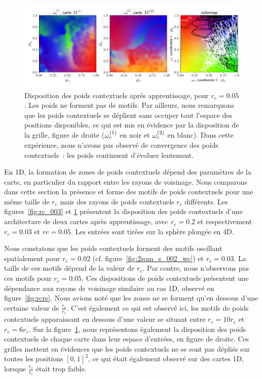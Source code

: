 \documentclass[../main]{subfiles}
\begin{document}
\begin{figure}
	\includegraphics[width=\textwidth]{wc_rc005_grid.pdf}
	\caption{Disposition des poids contextuels après apprentissage, pour $r_c =0.05$. Les poids ne forment pas de motifs. Par ailleurs, nous remarquons que les poids contextuels se déplient sans occuper tout l'espace des positions disponibles, ce qui est mis en évidence par la disposition de la grille, figure de droite ($\omega_c^{({1})}$ en noir et $\omega_c^{({2})}$ en blanc).
	Dans cette expérience, nous n'avons pas observé de convergence des poids contextuels~: les poids continuent d'évoluer lentement.
	\label{fig:rc_005}}
\end{figure}

En 1D, la formation de zones de poids contextuels dépend des paramètres de la carte, en particulier du rapport entre les rayons de voisinage.
Nous comparons dans cette section la présence et forme des motifs de poids contextuels pour une même taille de $r_e$ mais des rayons de poids contextuels $r_c$ différents.
Les figures~\ref{fig:rc_003} et \ref{fig:rc_005} présentent la disposition des poids contextuels d'une architecture de deux cartes après apprentissage, avec $r_e = 0.2$ et respectivement $r_c = 0.03$ et $rc = 0.05$. Les entrées sont tirées sur la sphère plongée en 4D.


Nous constatons que les poids contextuels forment des motifs oscillant spatialement pour $r_c = 0.02$ (cf. figure~\ref{fig:2som_s_002_wc}) et $r_c = 0.03$. La taille de ces motifs dépend de la valeur de $r_c$. Par contre, nous n'observons pas ces motifs pour $r_c = 0.05$.
Ces dispositions de poids contextuels présentent une dépendance aux rayons de voisinage similaire au cas 1D, observé en figure~\ref{fig:rcre}.
Nous avions noté que les zones ne se forment qu'en dessous d'une certaine valeur de $\frac{r_e}{r_c}$. C'est également ce qui est observé ici, les motifs de poids contextuels apparaissant en dessous d'une valeur se situant entre $r_e = 10 r_c$ et $r_e = 6 r_c$.
Sur la figure~\ref{fig:rc_005}, nous représentons également la disposition des poids contextuels de chaque carte dans leur espace d'entrées, en figure de droite.
Ces grilles mettent en évidences que les poids contextuels ne se sont pas dépliés sur toutes les positions $[0,1]^2$, ce qui était également observé sur des cartes 1D, lorsque $\frac{r_e}{r_c}$ était trop faible.
\end{document}
